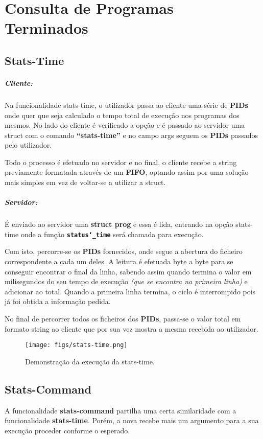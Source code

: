 \documentclass{report}
\begin{document}
\section{Consulta de Programas Terminados}

\subsection{Stats-Time}
\subparagraph{Cliente:} Na funcionalidade stats-time, o utilizador passa ao cliente uma série de \textbf{PIDs} onde quer que seja calculado o tempo total de execução nos programas dos mesmos.
No lado do cliente é verificado a opção e é passado ao servidor uma struct com o comando \textbf{“stats-time”} e no campo args seguem os \textbf{PIDs} passados pelo utilizador.\par
Todo o processo é efetuado no servidor e no final, o cliente recebe a string previamente formatada através de um \textbf{FIFO}, optando assim por uma solução mais simples em vez de voltar-se a utilizar a struct.

\newpage
\subparagraph{Servidor:} É enviado ao servidor uma \textbf{struct prog} e essa é lida, entrando na opção stats-time onde a função \textbf{\texttt{status\char`_time}} será chamada para execução. \par
Com isto, percorre-se os \textbf{PIDs} fornecidos, onde segue a abertura do ficheiro correspondente a cada um deles. A leitura é efetuada byte a byte para se conseguir encontrar o final da linha, sabendo assim quando termina o valor em milisegundos do seu tempo de execução \textit{(que se encontra na primeira linha)} e adicionar ao total. Quando a primeira linha termina, o ciclo é interrompido pois já foi obtida a informação pedida.\par
No final de percorrer todos os ficheiros dos \textbf{PIDs}, passa-se o valor total em formato string ao cliente que por sua vez mostra a mesma recebida ao utilizador.

\begin{figure}[h]
    \centering
    \texttt{[image: figs/stats-time.png]}
    \caption{Demonstração da execução da stats-time.}
    \label{f}
\end{figure}

\subsection{Stats-Command}
A funcionalidade \textbf{stats-command} partilha uma certa similaridade com a funcionalidade \textbf{stats-time}. Porém, a nova recebe mais um argumento para a sua execução proceder conforme o esperado.
\end{document}
